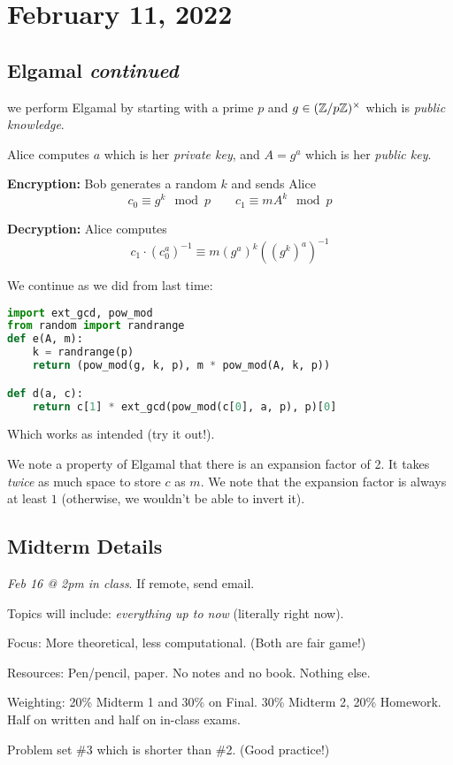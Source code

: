 \section{February 11, 2022}
\subsection{Elgamal \emph{continued}}

\recall we perform Elgamal by starting with a prime $p$ and $g\in (\mathbb Z/p\mathbb Z)^\times$ which is \emph{public knowledge}.

Alice computes $a$ which is her \emph{private key}, and $A = g^{a}$ which is her \emph{public key}.

\textbf{Encryption:} Bob generates a random $k$ and sends Alice
\[c_0\equiv g^k\mod{p}\qquad c_1\equiv mA^k\mod{p}\]

\textbf{Decryption:} Alice computes
\[c_1\cdot (c_0^a)^{-1}\equiv m(g^a)^k \left((g^k)^a\right)^{-1}\]

We continue as we did from last time:
\begin{lstlisting}[language=Python]
import ext_gcd, pow_mod
from random import randrange
def e(A, m): 
    k = randrange(p)
    return (pow_mod(g, k, p), m * pow_mod(A, k, p))

def d(a, c):
    return c[1] * ext_gcd(pow_mod(c[0], a, p), p)[0]
\end{lstlisting}
Which works as intended (try it out!).

We note a property of Elgamal that there is an expansion factor of 2. It takes \emph{twice} as much space to store $c$ as $m$. We note that the expansion factor is always at least $1$ (otherwise, we wouldn't be able to invert it).

\subsection{Midterm Details}
\emph{Feb 16 @ 2pm in class}. If remote, send email.

Topics will include: \emph{everything up to now} (literally right now).

Focus: More theoretical, less computational. (Both are fair game!)

Resources: Pen/pencil, paper. No notes and no book. Nothing else.

Weighting: 20\% Midterm 1 and 30\% on Final. 30\% Midterm 2, 20\% Homework. Half on written and half on in-class exams.

Problem set \#3 which is shorter than \#2. (Good practice!)

